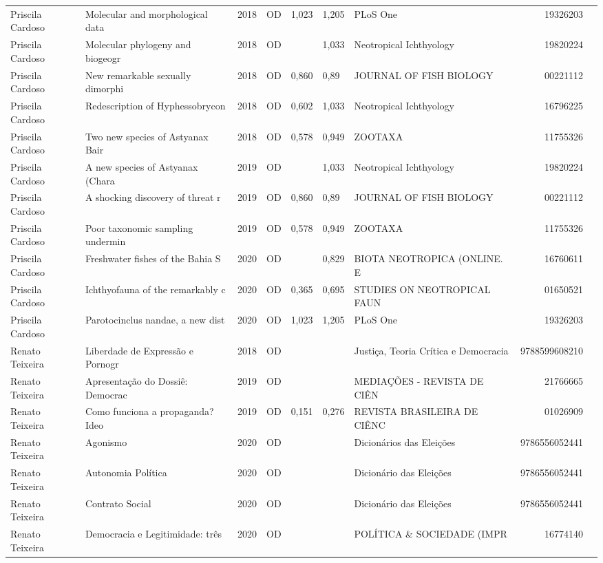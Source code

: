 \documentclass[12pt,brazil]{article}\usepackage[]{graphicx}\usepackage[]{xcolor}
\begin{document}
\begin{longtable}{lllrrllrr}
Priscila Cardoso & Molecular and morphological data & 2018 & OD & 1,023 & 1,205 & PLoS One & 19326203 \\
Priscila Cardoso & Molecular phylogeny and biogeogr & 2018 & OD &  & 1,033 & Neotropical Ichthyology & 19820224 \\
Priscila Cardoso & New remarkable sexually dimorphi & 2018 & OD & 0,860 & 0,89 & JOURNAL OF FISH BIOLOGY & 00221112 \\
Priscila Cardoso & Redescription of Hyphessobrycon  & 2018 & OD & 0,602 & 1,033 & Neotropical Ichthyology & 16796225 \\
Priscila Cardoso & Two new species of Astyanax Bair & 2018 & OD & 0,578 & 0,949 & ZOOTAXA & 11755326 \\
Priscila Cardoso & A new species of Astyanax (Chara & 2019 & OD &  & 1,033 & Neotropical Ichthyology & 19820224 \\
Priscila Cardoso & A shocking discovery of threat r & 2019 & OD & 0,860 & 0,89 & JOURNAL OF FISH BIOLOGY & 00221112 \\
Priscila Cardoso & Poor taxonomic sampling undermin & 2019 & OD & 0,578 & 0,949 & ZOOTAXA & 11755326 \\
Priscila Cardoso & Freshwater fishes of the Bahia S & 2020 & OD &  & 0,829 & BIOTA NEOTROPICA (ONLINE. E & 16760611 \\
Priscila Cardoso & Ichthyofauna of the remarkably c & 2020 & OD & 0,365 & 0,695 & STUDIES ON NEOTROPICAL FAUN & 01650521 \\
Priscila Cardoso & Parotocinclus nandae, a new dist & 2020 & OD & 1,023 & 1,205 & PLoS One & 19326203 \\
Renato Teixeira & Liberdade de Expressão e Pornogr & 2018 & OD &  &  & Justiça, Teoria Crítica e Democracia & 9788599608210 \\
Renato Teixeira & Apresentação do Dossiê: Democrac & 2019 & OD &  &  & MEDIAÇÕES - REVISTA DE CIÊN & 21766665 \\
Renato Teixeira & Como funciona a propaganda? Ideo & 2019 & OD & 0,151 & 0,276 & REVISTA BRASILEIRA DE CIÊNC & 01026909 \\
Renato Teixeira & Agonismo & 2020 & OD &  &  & Dicionários das Eleições & 9786556052441 \\
Renato Teixeira & Autonomia Política & 2020 & OD &  &  & Dicionário das Eleições & 9786556052441 \\
Renato Teixeira & Contrato Social & 2020 & OD &  &  & Dicionário das Eleições & 9786556052441 \\
Renato Teixeira & Democracia e Legitimidade: três  & 2020 & OD &  &  & POLÍTICA \& SOCIEDADE (IMPR & 16774140 \\

\end{longtable}
\end{document}
